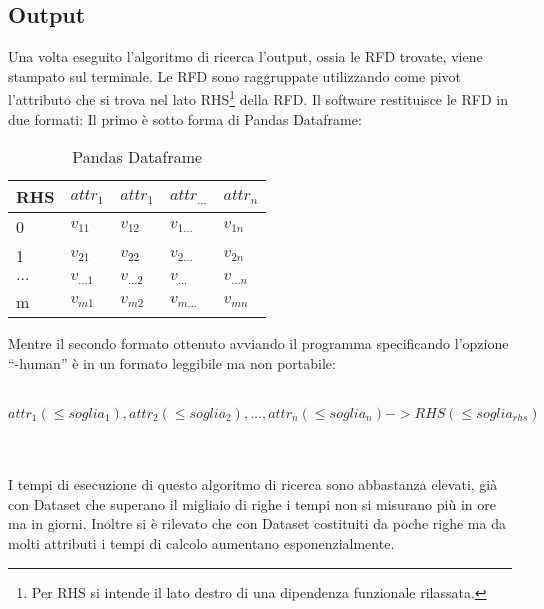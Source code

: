 \subsection{Output}
Una volta eseguito l’algoritmo di ricerca l’output, ossia le RFD trovate, viene stampato sul terminale. Le RFD sono raggruppate utilizzando come pivot l’attributo che si trova nel lato RHS\footnote{Per RHS si intende il lato destro di una dipendenza funzionale rilassata.} della RFD. Il software restituisce le RFD in due formati:
Il primo è sotto forma di Pandas Dataframe:
\begin{table}[h]
    \centering
    \begin{tabular}{l  l  l  l  l }
     RHS & $attr_1$ & $attr_1$ &$attr_{\ldots}$ & $attr_n$ \\
    \hline
    0 & $v_{11}$ & $v_{12}$ & $v_{1\ldots}$ & $v_{1n}$\\
    1 & $v_{21}$ & $v_{22}$ & $v_{2\ldots}$ & $v_{2n}$\\
    $\ldots$ & $v_{\ldots1}$ & $v_{\ldots2}$ & $v_{\ldots}$ & $v_{\ldots n}$\\
    m & $v_{m1}$ & $v_{m2}$ & $v_{m\ldots}$ & $v_{mn}$\\
    \end{tabular}
    \caption{Pandas Dataframe}
    \label{tab:pandas_dataframe}
\end{table}


Mentre il secondo formato ottenuto avviando il programma specificando l’opzione “-human” è in un formato leggibile ma non portabile:
\\~\\
\centerline{$attr_1(\leq soglia_1),attr_2(\leq soglia_2),\ldots,{attr_n}(\leq soglia_n)->RHS(\leq soglia_{rhs})$}
\\~\\
I tempi di esecuzione di questo algoritmo di ricerca sono abbastanza elevati, già con Dataset che superano il migliaio di righe i tempi non si misurano più in ore ma in giorni. Inoltre si è rilevato che con Dataset costituiti da poche righe ma da molti attributi i tempi di calcolo aumentano esponenzialmente.